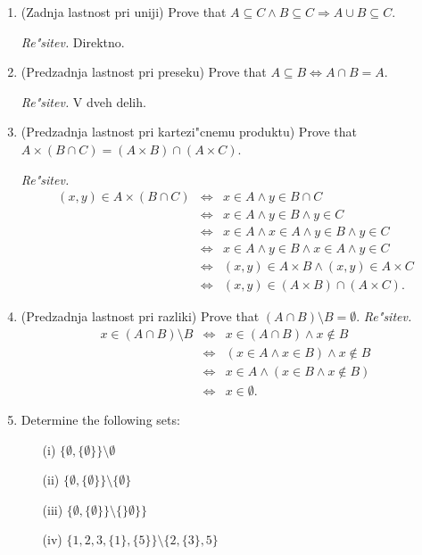 \documentclass[11pt,paper=b5,footinclude,headinclude]{scrbook} %
\theoremstyle{remark}
\theoremstyle{definition} %
\theoremstyle{theorem} %
\begin{document}
\begin{enumerate}
\item (Zadnja lastnost pri uniji) Prove that $A\subseteq C  \wedge B\subseteq C \Rightarrow A\cup B\subseteq C$.

\emph{ Re"sitev.} Direktno.

\item (Predzadnja lastnost pri preseku) Prove that $A\subseteq  B \Leftrightarrow A\cap B = A$.

\emph{ Re"sitev.} V dveh delih.

\item (Predzadnja lastnost pri kartezi"cnemu produktu) Prove that $A\times (B\cap C) = (A\times B)\cap (A\times C)$.

\emph{ Re"sitev.} 
\begin{eqnarray*}
(x,y)\in A\times (B\cap C) &\Leftrightarrow & x \in A \wedge y\in B\cap C\\
&\Leftrightarrow & x \in A \wedge y\in B  \wedge y\in C\\
&\Leftrightarrow & x \in A \wedge x \in A\wedge y\in B  \wedge y\in C\\
&\Leftrightarrow & x \in A \wedge  y\in B  \wedge x \in A\wedge y\in C\\
&\Leftrightarrow & (x,y) \in A\times B \wedge  (x,y) \in A\times C\\
&\Leftrightarrow & (x,y) \in (A\times B)\cap   (A\times C).
\end{eqnarray*}

\item (Predzadnja lastnost pri razliki) Prove that $(A\cap B )\setminus B = \emptyset$.
\emph{ Re"sitev.} 
\begin{eqnarray*}
x\in (A\cap B )\setminus B  &\Leftrightarrow & x \in (A\cap B)  \wedge x\notin B\\
&\Leftrightarrow & (x\in A\wedge x\in  B ) \wedge x\notin B\\
&\Leftrightarrow & x\in A\wedge (x\in  B  \wedge x\notin B)\\
&\Leftrightarrow & x\in \emptyset.
\end{eqnarray*}

\item Determine the following sets:
\begin{enumerate}
\item[(i)] $\{\emptyset, \{\emptyset\}\}\setminus \emptyset$ \quad [$\{\emptyset, \{\emptyset\}\}$]
\item[(ii)] $\{\emptyset, \{\emptyset\}\}\setminus \{\emptyset\}$
\item[(iii)] $\{\emptyset, \{\emptyset\}\}\setminus \{\}\emptyset\}\}$
\item[(iv)] $\{1,2,3,\{1\}, \{5\}  \}\setminus \{2,\{3\},5\}$
\end{enumerate}


\end{enumerate}
\end{document}
